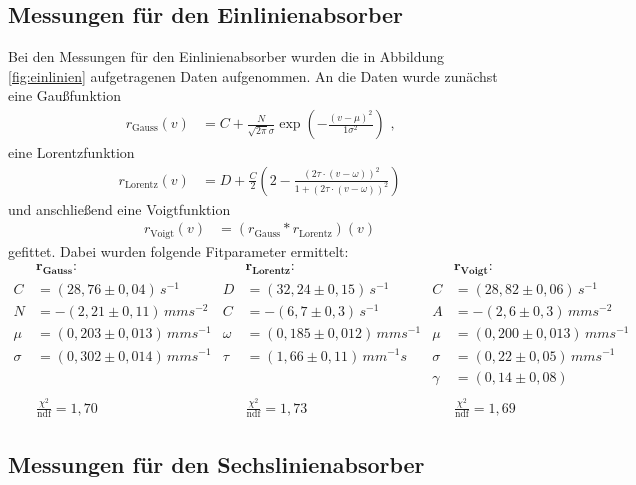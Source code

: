 \subsection{Messungen für den Einlinienabsorber}
Bei den Messungen für den Einlinienabsorber wurden die in Abbildung \ref{fig:einlinien} aufgetragenen Daten aufgenommen. An die Daten wurde zunächst eine Gaußfunktion
\begin{align}
	r_\mathrm{Gauss}(v)&=C+\frac{N}{\sqrt{2\pi}\sigma}\exp(-\frac{(v-\mu)^2}{1\sigma^2})\text{ ,}
\end{align}
eine Lorentzfunktion 
\begin{align}
	r_\mathrm{Lorentz}(v)&=D+\frac{C}{2}\left(2-\frac{\left(2\tau\cdot(v-\omega)\right)^2}{1+\left(2\tau\cdot(v-\omega)\right)^2}\right)
\end{align}
und anschließend eine Voigtfunktion 
\begin{align}
	r_\mathrm{Voigt}(v)&=\left(r_\mathrm{Gauss}*r_\mathrm{Lorentz}\right)(v)
\end{align}
gefittet. Dabei wurden folgende Fitparameter ermittelt:
\begin{align*}
	&\mathbf{r_\textbf{Gauss}}\textbf{:}&&\mathbf{r_\textbf{Lorentz}}\textbf{:}&&\mathbf{r_\textbf{Voigt}}\textbf{:}\\
	C&=(28,76\pm0,04)\,\si{s^{-1}}&D&=(32,24\pm0,15)\,\si{s^{-1}}&C&=(28,82\pm0,06)\,\si{s^{-1}}
	\\N&=-(2,21\pm0,11)\,\si{mms^{-2}}&C&=-(6,7\pm0,3)\,\si{s^{-1}}&A&=-(2,6\pm0,3)\,\si{mms^{-2}}
	\\\mu&=(0,203\pm0,013)\,\si{mms^{-1}}&\omega&=(0,185\pm0,012)\,\si{mms^{-1}}&\mu&=(0,200\pm0,013)\,\si{mms^{-1}}
	\\\sigma&=(0,302\pm0,014)\,\si{mms^{-1}}&\tau&=(1,66\pm0,11)\,\si{mm^{-1}s}&\sigma&=(0,22\pm0,05)\,\si{mms^{-1}}
	\\&&&&\gamma&=(0,14\pm0,08)\\\ 
	\\&\frac{\chi^2}{\mathrm{ndf}}=1,70&&\frac{\chi^2}{\mathrm{ndf}}=1,73&&\frac{\chi^2}{\mathrm{ndf}}=1,69
\end{align*}




\subsection{Messungen für den Sechslinienabsorber}

